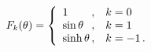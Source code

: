 \begin{equation}
F_k(\theta) = \left\{\begin{array}{l@{\,,\quad}l}
                     1 & k=0 \\ \sin\theta & k = 1 \\ \sinh\theta & k = -1\,.
                     \end{array} \right.
\end{equation}

